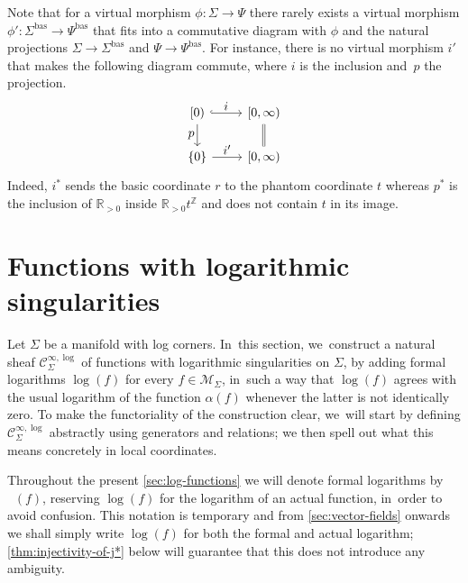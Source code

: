 \documentclass[10pt]{amsart}
\let\tst\textstyle
\theoremstyle{definition}
\theoremstyle{remark}
\newenvironment{remark}
  {\pushQED{\qed}\renewcommand{\qedsymbol}{$\lozenge$}\remarkx}
  {\popQED\endremarkx}
\newcommand{\RR}{\mathbb{R}}
\newcommand{\ZZ}{\mathbb{Z}}
\newcommand{\ulog}{\mathop{\widetilde{\log}}\nolimits}
\newcommand{\cM}{\mathscr{M}}
\newcommand{\Cinflog}[1]{\mathscr{C}^{\infty,\log}_{#1}}
\newcommand{\Sig}{\Sigma}
\newcommand{\bas}[1]{{#1}^{\mathrm{bas}}}
\newcommand{\Sigbas}{\bas{\Sig}}
\newcommand{\Psibas}{\bas{\Psi}}
\begin{document}
\begin{remark}
Note that for a virtual morphism $\phi:\Sig\to\Psi$ there rarely exists a virtual morphism $\phi':\Sigbas\to \Psibas$ that fits into a commutative diagram with $\phi$ and the natural projections $\Sig\to\Sigbas$ and $\Psi\to\Psibas$. For instance, there is no virtual morphism $i'$ that makes the following diagram commute, where $i$ is the inclusion and~$p$ the projection.
\begin{equation*}
\begin{tikzcd}
{[0)} \ar[r,"\tst i",hook] \ar[d,"\tst p"'] & {[0,\infty)} \ar[d,equal] \\
\{0\} \ar[r,"\tst i'"]& {[0,\infty)}
\end{tikzcd}
\end{equation*}
Indeed, $i^*$ sends the basic coordinate $r$ to the phantom coordinate $t$ whereas $p^*$ is the inclusion of $\RR_{>0}$ inside $\RR_{>0}t^\ZZ$ and does not contain $t$ in its image.
\end{remark}

\section{Functions with logarithmic singularities}
\label{sec:log-functions}
Let $\Sig$ be a manifold with log corners. In~this section, we~construct a natural sheaf $\Cinflog{\Sig}$ of functions with logarithmic singularities on $\Sig$, by adding formal logarithms $\log(f)$ for every $f \in \cM_{\Sig}$, in~such a way that $\log(f)$ agrees with the usual logarithm of the function $\alpha(f)$ whenever the latter is not identically zero. To make the functoriality of the construction clear, we~will start by defining $\Cinflog{\Sig}$ abstractly using generators and relations; we then spell out what this means concretely in local coordinates.

Throughout the present \autoref{sec:log-functions} we will denote formal logarithms by $\ulog(f)$, reserving $\log(f)$ for the logarithm of an actual function, in~order to avoid confusion. This notation is temporary and from \autoref{sec:vector-fields} onwards we shall simply write $\log(f)$ for both the formal and actual logarithm; \autoref{thm:injectivity-of-j*} below will guarantee that this does not introduce any ambiguity.
\end{document}
